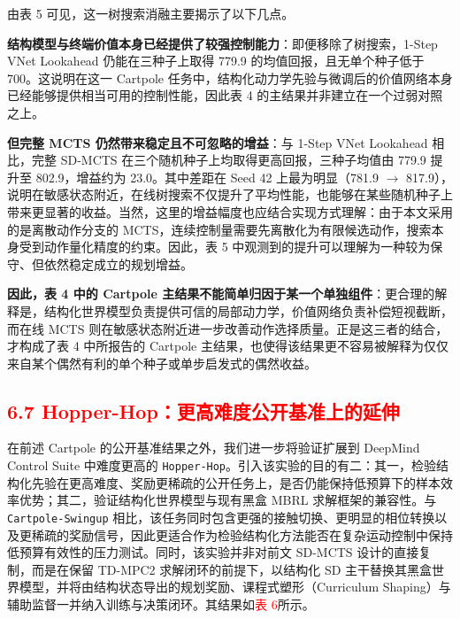 \documentclass[UTF8]{ctexart}
\begin{document}
由表 5 可见，这一树搜索消融主要揭示了以下几点。

\textbf{结构模型与终端价值本身已经提供了较强控制能力}：即便移除了树搜索，1-Step VNet Lookahead 仍能在三种子上取得
779.9 的均值回报，且无单个种子低于 700。这说明在这一 Cartpole 任务中，结构化动力学先验与微调后的价值网络本身已经能够提供相当可用的控制性能，因此表 4 的主结果并非建立在一个过弱对照之上。

\textbf{但完整 MCTS 仍然带来稳定且不可忽略的增益}：与 1-Step VNet Lookahead 相比，完整
SD-MCTS 在三个随机种子上均取得更高回报，三种子均值由 779.9 提升至
802.9，增益约为 23.0。其中差距在 Seed 42 上最为明显（781.9
\(\rightarrow\) 817.9），说明在敏感状态附近，在线树搜索不仅提升了平均性能，也能够在某些随机种子上带来更显著的收益。当然，这里的增益幅度也应结合实现方式理解：由于本文采用的是离散动作分支的 MCTS，连续控制量需要先离散化为有限候选动作，搜索本身受到动作量化精度的约束。因此，表 5 中观测到的提升可以理解为一种较为保守、但依然稳定成立的规划增益。

\textbf{因此，表 4 中的 Cartpole 主结果不能简单归因于某一个单独组件}：更合理的解释是，结构化世界模型负责提供可信的局部动力学，价值网络负责补偿短视截断，而在线 MCTS 则在敏感状态附近进一步改善动作选择质量。正是这三者的结合，才构成了表 4 中所报告的 Cartpole 主结果，也使得该结果更不容易被解释为仅仅来自某个偶然有利的单个种子或单步启发式的偶然收益。

\hypertarget{sub-hopper-extension}{%
\subsection{\textcolor{red}{6.7 Hopper-Hop：更高难度公开基准上的延伸}}\label{sub-hopper-extension}}

{\color{red}
在前述 Cartpole 的公开基准结果之外，我们进一步将验证扩展到 DeepMind Control Suite 中难度更高的 \texttt{Hopper-Hop}。引入该实验的目的有二：其一，检验结构化先验在更高难度、奖励更稀疏的公开任务上，是否仍能保持低预算下的样本效率优势；其二，验证结构化世界模型与现有黑盒 MBRL 求解框架的兼容性。与 \texttt{Cartpole-Swingup} 相比，该任务同时包含更强的接触切换、更明显的相位转换以及更稀疏的奖励信号，因此更适合作为检验结构化方法能否在复杂运动控制中保持低预算有效性的压力测试。同时，该实验并非对前文 SD-MCTS 设计的直接复制，而是在保留 TD-MPC2 求解闭环的前提下，以结构化 SD 主干替换其黑盒世界模型，并将由结构状态导出的规划奖励、课程式塑形（Curriculum Shaping）与辅助监督一并纳入训练与决策闭环。其结果如\textcolor{red}{表 6}所示。}
\end{document}
